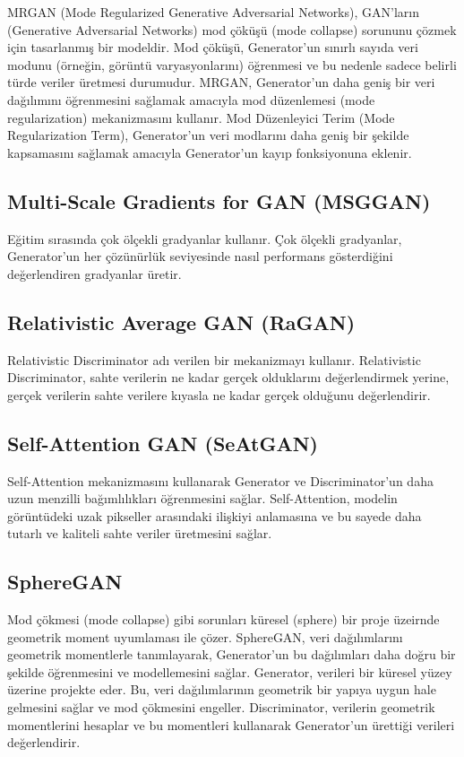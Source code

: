 MRGAN (Mode Regularized Generative Adversarial Networks), GAN’ların (Generative Adversarial Networks) mod çöküşü (mode collapse) sorununu çözmek için tasarlanmış bir modeldir. Mod çöküşü, Generator'un sınırlı sayıda veri modunu (örneğin, görüntü varyasyonlarını) öğrenmesi ve bu nedenle sadece belirli türde veriler üretmesi durumudur. MRGAN, Generator'un daha geniş bir veri dağılımını öğrenmesini sağlamak amacıyla mod düzenlemesi (mode regularization) mekanizmasını kullanır. Mod Düzenleyici Terim (Mode Regularization Term), Generator'un veri modlarını daha geniş bir şekilde kapsamasını sağlamak amacıyla Generator'un kayıp fonksiyonuna eklenir. 

\subsection{Multi-Scale Gradients for GAN (MSGGAN)}

Eğitim sırasında çok ölçekli gradyanlar kullanır. Çok ölçekli gradyanlar, Generator'un her çözünürlük seviyesinde nasıl performans gösterdiğini değerlendiren gradyanlar üretir.

\subsection{Relativistic Average GAN (RaGAN)}

Relativistic Discriminator adı verilen bir mekanizmayı kullanır. Relativistic Discriminator, sahte verilerin ne kadar gerçek olduklarını değerlendirmek yerine, gerçek verilerin sahte verilere kıyasla ne kadar gerçek olduğunu değerlendirir.

\subsection{Self-Attention GAN (SeAtGAN)}

Self-Attention mekanizmasını kullanarak Generator ve Discriminator'un daha uzun menzilli bağımlılıkları öğrenmesini sağlar. Self-Attention, modelin görüntüdeki uzak pikseller arasındaki ilişkiyi anlamasına ve bu sayede daha tutarlı ve kaliteli sahte veriler üretmesini sağlar. 

\subsection{SphereGAN}

Mod çökmesi (mode collapse) gibi sorunları küresel (sphere) bir proje üzeirnde geometrik moment uyumlaması ile çözer. SphereGAN, veri dağılımlarını geometrik momentlerle tanımlayarak, Generator'un bu dağılımları daha doğru bir şekilde öğrenmesini ve modellemesini sağlar. Generator, verileri bir küresel yüzey üzerine projekte eder. Bu, veri dağılımlarının geometrik bir yapıya uygun hale gelmesini sağlar ve mod çökmesini engeller. Discriminator, verilerin geometrik momentlerini hesaplar ve bu momentleri kullanarak Generator'un ürettiği verileri değerlendirir.

